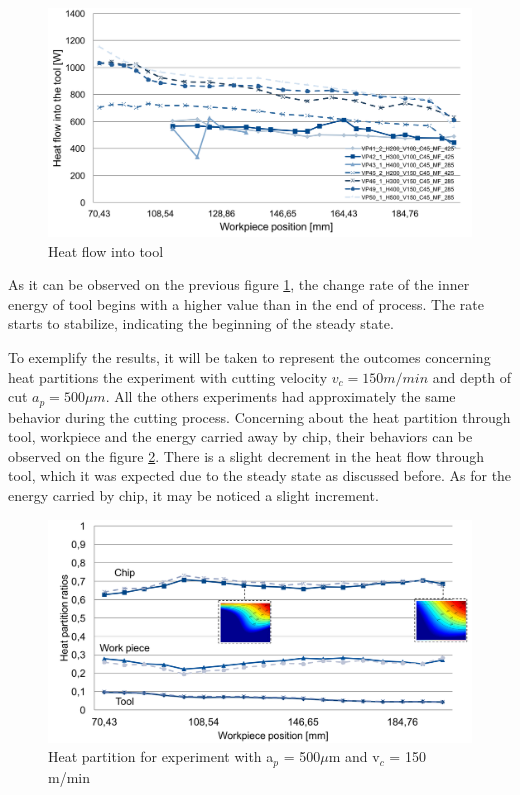 	\begin{figure}[H]
		\centering
		\captionsetup{justification=centering}
		\includegraphics[scale=0.55]{Imagens/energyTool2.png}
		\caption{Heat flow into tool}
		\label{fig:hflowTool}
	\end{figure}

	As it can be observed on the previous figure \ref{fig:hflowTool}, the change rate of the inner energy of tool begins with a higher value than in the end of process. The rate starts to stabilize, indicating the beginning of the steady state. 

	To exemplify the results, it will be taken to represent the outcomes concerning heat partitions the experiment with cutting velocity $v_{c} = 150 m/min$ and depth of cut $a_{p} = 500 \mu m$. All the others experiments had approximately the same behavior during the cutting process.
	Concerning about the heat partition through tool, workpiece and the energy carried away by chip, their behaviors can be observed on the figure \ref{fig:hpartExp}. There is a slight decrement in the heat flow through tool, which it was expected due to the steady state as discussed before. As for the energy carried by chip, it may be noticed a slight increment.

	\begin{figure}[H]
		\centering
		\captionsetup{justification=centering}
		\includegraphics[scale=0.55]{Imagens/partition500150.png}
		\caption{Heat partition for experiment with a$_{p}$ = 500$\mu$m and v$_{c}$ = 150 m/min}
		\label{fig:hpartExp}
	\end{figure}

